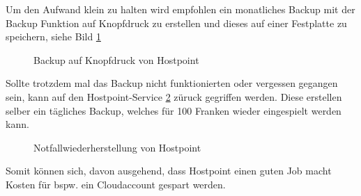 Um den Aufwand klein zu halten wird empfohlen ein monatliches Backup mit der Backup Funktion auf Knopfdruck zu erstellen und dieses auf einer Festplatte zu speichern, siehe Bild \ref{img:Backup_Funktion}
\begin{figure}[h!]
	\centering
	\caption{Backup auf Knopfdruck von Hostpoint}
	\label{img:Backup_Funktion}
\end{figure}
Sollte trotzdem mal das Backup nicht funktionierten oder vergessen gegangen sein, kann auf den Hostpoint-Service \ref{img:Notfallwiederherstellung}  züruck gegriffen werden. Diese erstellen selber ein tägliches Backup, welches für 100 Franken wieder eingespielt werden kann.
\begin{figure}[h!]
	\centering
	\caption{Notfallwiederherstellung von Hostpoint}
	\label{img:Notfallwiederherstellung}
\end{figure}
Somit können sich, davon ausgehend, dass Hostpoint einen guten Job macht Kosten für bspw. ein Cloudaccount gespart werden.

